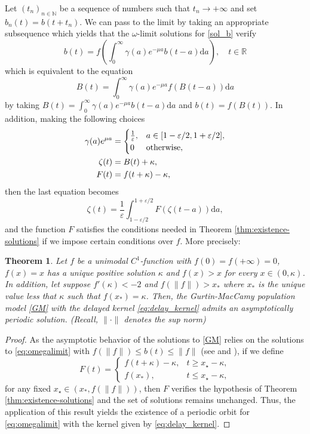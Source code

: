 \documentclass[a4paper,11pt]{article}
\theoremstyle{plain}
\newtheorem{thm}{Theorem}[section]
\theoremstyle{definition}
\theoremstyle{definition}
\newcommand{\N}{\mathbb{N}}
\newcommand{\R}{\mathbb{R}}
\newcommand{\dd}{\mathrm{d}}
\numberwithin{equation}{section}
\begin{document}
Let $(t_n)_{n\in \N}$ be a sequence of numbers such that $t_n\to +\infty$ and set $b_n(t) = b(t + t_n)$. We can pass to the limit by taking an appropriate subsequence which yields that the $\omega$-limit solutions for \eqref{sol_b} verify
\begin{equation}\label{eq:omegalimit}
    b(t) = f\left( \int_0^\infty \gamma(a)e^{-\mu a} b(t-a)\dd a \right), \quad t\in\R
\end{equation}
which is equivalent to the equation
\[
    B(t) = \int_0^\infty \gamma(a)e^{-\mu a} f(B(t-a))\dd a
\]
by taking $B(t)= \int_0^\infty \gamma(a)e^{-\mu a} b(t-a)\dd a$ and $b(t)=f(B(t))$. In addition, making the following choices
\begin{align}
    \gamma(a)e^{\mu a} &= \begin{cases}
        \frac{1}{\varepsilon},  & a\in[1-\varepsilon/2,1+\varepsilon/2], \\
        0 & \text{otherwise},
    \end{cases} \label{eq:delay_kernel}\\
    \zeta(t) &= B(t)+\kappa, \notag \\
    F(t) &= f(t+\kappa) - \kappa, \notag
\end{align}
then the last equation becomes
\[
    \zeta(t) = \frac{1}{\varepsilon}\int_{1-\varepsilon/2}^{1+\varepsilon/2} F(\zeta(t-a))\dd a,
\]
and the function $F$ satisfies the conditions needed in Theorem \ref{thm:existence-solutions} if we impose certain conditions over $f$. More precisely:

\begin{thm}\label{main_th2}
Let $f$ be a unimodal $C^1$-function with $f(0)=f(+\infty)=0$, $f(x)=x$ has a unique positive solution $\kappa$ and $f(x)>x$ for every $x\in(0,\kappa)$. In addition, let suppose $f'(\kappa)<-2$ and $f(\|f\|)> x_*$ where $x_*$ is the unique value less that $\kappa$ such that $f(x_*)=\kappa$. Then, the Gurtin-MacCamy population model \eqref{GM} with the delayed kernel \eqref{eq:delay_kernel} admits an asymptotically periodic solution. (Recall, $\|\cdot\|$ denotes the sup norm)
\end{thm}
\begin{proof}
As the asymptotic behavior of the solutions to \eqref{GM} relies on the solutions to \eqref{eq:omegalimit} with $f(\|f\|)\leq b(t)\leq \|f\|$ (see \cite[Theorem 1]{HT} and \cite[Proposition 5.12]{SmithThieme}), if we define
\[
    F(t) = \begin{cases}
        f(t+\kappa)-\kappa, & t\geq x_\star-\kappa,\\
        f(x_*) , & t\leq x_\star-\kappa,
    \end{cases}
\]
for any fixed $x_\star\in(x_*, f(\|f\|))$, then $F$ verifies the hypothesis of Theorem \ref{thm:existence-solutions} and the set of solutions remains unchanged. Thus, the application of this result yields the existence of a periodic orbit for \eqref{eq:omegalimit} with the kernel given by \eqref{eq:delay_kernel}.
\end{proof}
\end{document}
